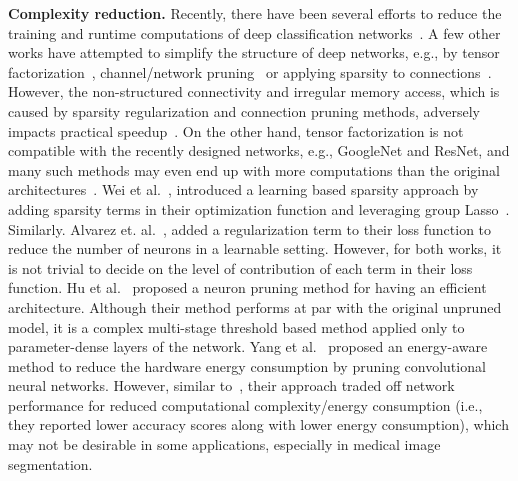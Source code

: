 \documentclass{article}
\begin{document}
\textbf{Complexity reduction.} Recently, there have been several efforts to reduce the training and runtime computations of deep classification networks~\cite{leroux2018iamnn,howard2017mobilenets, zhang2017shufflenet, iandola2016squeezenet}. A few other works have attempted to simplify the structure of deep networks, e.g., by tensor factorization~\cite{jaderberg2014speeding,kim2015compression,lebedev2014speeding}, channel/network pruning~\cite{wen2016learning,hu2016network} or applying sparsity to connections~\cite{han2015learning,han2015deep,liu2015sparse,guo2016dynamic,han2016eie}. However, the non-structured connectivity and irregular memory access, which is caused by sparsity regularization and connection pruning methods, adversely impacts practical speedup~\cite{wen2016learning}. On the other hand, tensor factorization is not compatible with the recently designed networks, e.g., GoogleNet and ResNet, and many such methods may even end up with more computations than the original architectures~\cite{he2017channel}. Wei et al.~\cite{wen2016learning}, introduced a learning based sparsity approach by adding sparsity terms in their optimization function and leveraging group Lasso~\cite{yuan2006model}. Similarly. Alvarez et. al.~\cite{alvarez2016learning}, added a regularization term to their loss function to reduce the number of neurons in a learnable setting. However, for both works, it is not trivial to decide on the level of contribution of each term in their loss function. Hu et al.~\cite{hu2016network} proposed a neuron pruning method for having an efficient architecture. Although their method performs at par with the original unpruned model, it is a complex multi-stage threshold based method applied only to parameter-dense layers of the network. Yang et al.~\cite{yang2017designing} proposed an energy-aware method to reduce the hardware energy consumption by pruning convolutional neural networks. However, similar to~\cite{liu2015sparse,denton2014exploiting,jaderberg2014speeding,he2017channel}, their approach traded off network performance  for reduced computational complexity/energy consumption (i.e., they reported lower accuracy scores along with   lower energy consumption), which may not be desirable in some applications, especially in medical image segmentation. 
\end{document}
